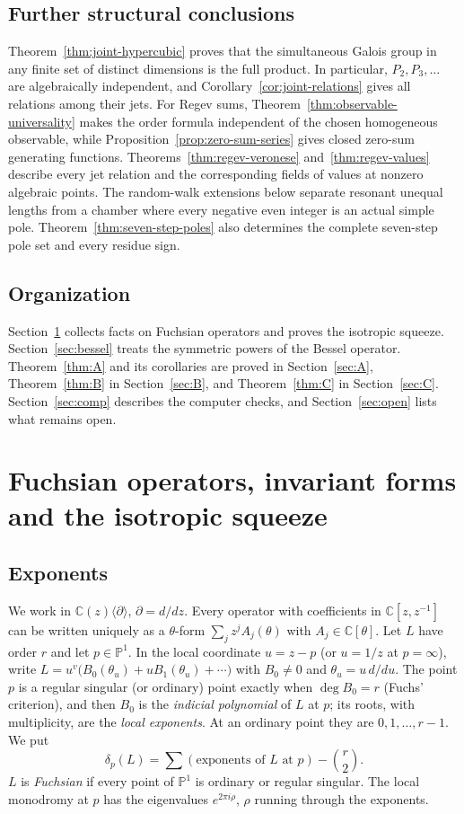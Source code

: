 \documentclass[11pt]{amsart}
\theoremstyle{definition}
\newcommand{\C}{\mathbb C}
\newcommand{\PP}{\mathbb P}
\begin{document}
\subsection{Further structural conclusions}
Theorem~\ref{thm:joint-hypercubic} proves that the simultaneous Galois group
in any finite set of distinct dimensions is the full product.  In
particular, $P_2,P_3,\ldots$ are algebraically independent, and
Corollary~\ref{cor:joint-relations} gives all relations among their jets.
For Regev sums, Theorem~\ref{thm:observable-universality} makes the order
formula independent of the chosen homogeneous observable, while
Proposition~\ref{prop:zero-sum-series} gives closed zero-sum generating
functions.  Theorems~\ref{thm:regev-veronese} and~\ref{thm:regev-values}
describe every jet relation and the corresponding fields of values at
nonzero algebraic points.  The random-walk extensions below separate
resonant unequal lengths from a chamber where every negative even
integer is an actual simple pole. Theorem~\ref{thm:seven-step-poles}
also determines the complete seven-step pole set and every residue sign.

\subsection*{Organization}
Section~\ref{sec:fuchs} collects facts on Fuchsian operators and proves the isotropic squeeze. Section~\ref{sec:bessel} treats the symmetric powers of the Bessel operator. Theorem~\ref{thm:A} and its corollaries are proved in Section~\ref{sec:A}, Theorem~\ref{thm:B} in Section~\ref{sec:B}, and Theorem~\ref{thm:C} in Section~\ref{sec:C}. Section~\ref{sec:comp} describes the computer checks, and Section~\ref{sec:open} lists what remains open.
\section{Fuchsian operators, invariant forms and the isotropic squeeze}\label{sec:fuchs}

\subsection{Exponents}
We work in $\C(z)\langle\partial\rangle$, $\partial=d/dz$. Every operator with coefficients in $\C[z,z^{-1}]$ can be written uniquely as a $\theta$-form $\sum_jz^jA_j(\theta)$ with $A_j\in\C[\theta]$. Let $L$ have order $r$ and let $p\in\PP^1$. In the local coordinate $u=z-p$ (or $u=1/z$ at $p=\infty$), write $L=u^v\bigl(B_0(\theta_u)+uB_1(\theta_u)+\cdots\bigr)$ with $B_0\ne0$ and $\theta_u=u\,d/du$. The point $p$ is a regular singular (or ordinary) point exactly when $\deg B_0=r$ (Fuchs' criterion), and then $B_0$ is the \emph{indicial polynomial} of $L$ at $p$; its roots, with multiplicity, are the \emph{local exponents}. At an ordinary point they are $0,1,\dots,r-1$. We put
\[
\delta_p(L)=\sum(\text{exponents of }L\text{ at }p)-\binom r2 .
\]
$L$ is \emph{Fuchsian} if every point of $\PP^1$ is ordinary or regular singular. The local monodromy at $p$ has the eigenvalues $e^{2\pi i\rho}$, $\rho$ running through the exponents.
\end{document}
